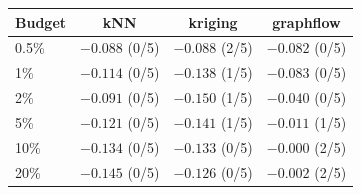 \begin{tabular}{lccc}
\toprule
Budget & kNN & kriging & graphflow \\
\midrule
0.5\% & $-0.088$ (0/5) & $-0.088$ (2/5) & $-0.082$ (0/5) \\
1\% & $-0.114$ (0/5) & $-0.138$ (1/5) & $-0.083$ (0/5) \\
2\% & $-0.091$ (0/5) & $-0.150$ (1/5) & $-0.040$ (0/5) \\
5\% & $-0.121$ (0/5) & $-0.141$ (1/5) & $-0.011$ (1/5) \\
10\% & $-0.134$ (0/5) & $-0.133$ (0/5) & $-0.000$ (2/5) \\
20\% & $-0.145$ (0/5) & $-0.126$ (0/5) & $-0.002$ (2/5) \\
\bottomrule
\end{tabular}